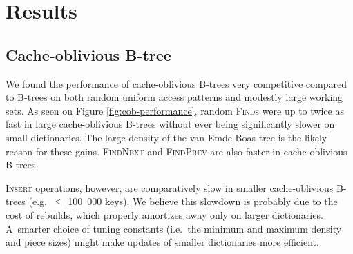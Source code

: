 \chapter{Results}
\label{chapter:results}

\section{Cache-oblivious B-tree}
We found the performance of cache-oblivious B-trees very competitive compared
to B-trees on both random uniform access patterns and modestly large working
sets. As seen on Figure \ref{fig:cob-performance}, random \textsc{Find}s
were up to twice as fast in large cache-oblivious B-trees without ever being
significantly slower on small dictionaries.
The large density of the van Emde Boas tree is the likely reason for these
gains.
\textsc{FindNext} and \textsc{FindPrev} are also faster in cache-oblivious
B-trees.

\textsc{Insert} operations, however, are comparatively slow in
smaller cache-oblivious B-trees (e.g.\ $\leq$ 100~000 keys). We believe
this slowdown is probably due to the cost of rebuilds, which properly
amortizes away only on larger dictionaries. A~smarter choice of tuning
constants (i.e.\ the minimum and maximum density and piece sizes) might
make updates of smaller dictionaries more efficient.

